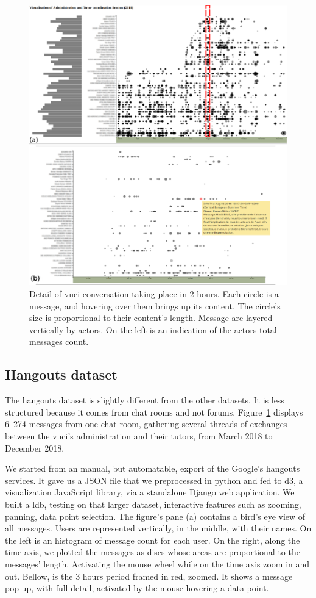 \documentclass[a4paper,twoside]{article}
\begin{document}
\begin{figure}[t]
  \centering
  \includegraphics[width=.5\textwidth]{images/uvci_portrait}
  \small{
    \caption{\label{fig:hgconv}
      Detail of \gls{vuci} conversation taking place in 2 hours.  Each circle is a message, and hovering over them brings up its content.  The circle's size is proportional to their content's length.  Message are layered vertically by actors.  On the left is an indication of the actors total messages count.
    }}
\end{figure}

\subsection{Hangouts dataset}

The hangouts dataset is slightly different from the other datasets. It is less structured because it comes from chat rooms and not forums.  Figure~\ref{fig:hgconv} displays 6~274 messages from one chat room, gathering several threads of exchanges between the \gls{vuci}'s administration and their tutors, from March 2018 to December 2018.

We started from an manual, but automatable, export of the Google's hangouts services.  It gave us a JSON file that we preprocessed in python and fed to d3, a visualization JavaScript library, via a standalone Django web application.  We built a \gls{ldb}, testing on that larger dataset, interactive features such as zooming, panning, data point selection.
The figure's pane (a) contains a bird's eye view of all messages.  Users are represented vertically, in the middle,  with their names.  On the left is an histogram of message count for each user. On the right, along the time axis, we plotted the messages as discs whose areas are proportional to the messages' length. Activating the mouse wheel while on the time axis zoom in and out.  Bellow, is the 3 hours period framed in red, zoomed.  It shows a message pop-up, with full detail, activated by the mouse hovering a data point. 
\end{document}
